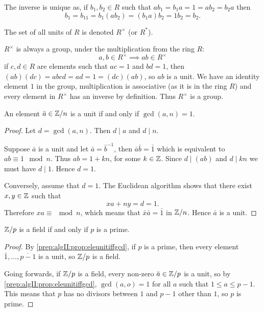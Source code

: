 \documentclass[10pt, a4paper]{article}
\begin{document}
The inverse is unique as,
if $b_1, b_2 \in R$ such that $ab_1 = b_1a = 1 = ab_2 = b_2a$ then
\[
b_1 = b_11 = b_1(ab_2) = (b_1a)b_2 = 1b_2 = b_2.
\]

The set of all units of $R$ is denoted $R ^ {\times}$
(or $R ^ *$).

$R ^ {\times}$ is always a group,
under the multiplication from the ring $R$:
\[
a, b \in R ^ {\times} \implies ab \in R ^ {\times}
\]
if $c, d \in R$ are elements such that $ac = 1$ and $bd = 1$,
then $(ab)(dc) = abcd = ad = 1 = (dc)(ab)$,
so $ab$ is a unit.
We have an identity element $1$ in the group,
multiplication is associative
(as it is in the ring $R$)
and every element in $R ^ {\times}$ has an inverse by definition.
Thus $R ^ {\times}$ is a group.


\begin{proposition}\label{prep:algII:prop:eleunitiffgcd}
    An element $\bar{a} \in \mathbb{Z} / n$  is a unit if and only if $\gcd(a, n) = 1$.

    \begin{proof}
        Let $d = \gcd(a, n)$.
        Then $d \mid a$ and $d \mid n$.

        Suppose $\bar{a}$ is a unit and let $\bar{a} = \bar{b} ^ {-1}$,
        then $\bar{a}\bar{b} = \bar{1}$ which is equivalent to $ab \equiv 1\mod{n}$.
        Thus $ab = 1 + kn$,
        for some $k \in \mathbb{Z}$.
        Since $d \mid (ab)$ and $d \mid kn$ we must have $d \mid 1$.
        Hence $d = 1$.
        
        Conversely,
        assume that $d = 1$.
        The Euclidean algorithm shows that there exist $x, y \in \mathbb{Z}$ such that 
        \[
        xa + ny = d = 1.
        \]
        Therefore $xa \equiv \mod{n}$,
        which means that $\bar{x}\bar{a} = \bar{1}$ in $\mathbb{Z} / n$.
        Hence $\bar{a}$ is a unit.
    \end{proof}
\end{proposition}

\begin{corollary}\label{prep:algII:cor:zpfieldifprime}
    $\mathbb{Z} / p$ is a field if and only if $p$ is a prime.

    \begin{proof}
        By \autoref{prep:algII:prop:eleunitiffgcd},
        if $p$ is a prime,
        then every element $\bar{1}, \dotsc, \overline{p - 1}$ is a unit,
        so $\mathbb{Z} / p$ is a field.

        Going forwards,
        if $\mathbb{Z} / p$ is a field,
        every non-zero $\bar{a} \in \mathbb{Z} / p$ is a unit,
        so by \autoref{prep:algII:prop:eleunitiffgcd},
        $\gcd(a, o) = 1$ for all $a$ such that $1 \leq a \leq p - 1$.
        This means that $p$ has no divisors between $1$ and $p - 1$ other than $1$,
        so $p$ is prime.
    \end{proof}
\end{corollary}
\end{document}
